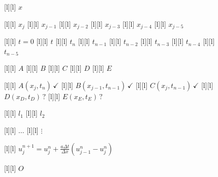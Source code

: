 \begin{figure}[ht]
	\centering
	\footnotesize

	[l] {$x$}

	[l] {$x_{j}$}
	[l] {$x_{j-1}$}
	[l] {$x_{j-2}$}
	[l] {$x_{j-3}$}
	[l] {$x_{j-4}$}
	[l] {$x_{j-5}$}


	[l] {$t=0$}
	[l] {$t$}
	[l] {$t_n$}
	[l] {$t_{n-1}$}
	[l] {$t_{n-2}$}
	[l] {$t_{n-3}$}
	[l] {$t_{n-4}$}
	[l] {$t_{n-5}$}

	[l] {$A$}
	[l] {$B$}
	[l] {$C$}
	[l] {$D$}
	[l] {$E$}

	[l] {$A(x_j,t_n)\,\checkmark$}
	[l] {$B(x_{j-1},t_{n-1})\,\checkmark$}
	[l] {$C(x_{j},t_{n-1})\,\checkmark$}
	[l] {$D(x_D,t_D)\,?$}
	[l] {$E(x_E,t_E)\, ?$}

	[l] {$l_1$}
	[l] {$l_2$}

	[l] {$\dots$}
	[l] {$\vdots$}

	[l] {$\displaystyle u_{j}^{n+1} = u_{j}^{n} + \frac{a\Delta t}{\Delta x}\left(u_{j-1}^{n}-u_{j}^{n}\right)$}





	[l] {$O$}


\end{figure}

